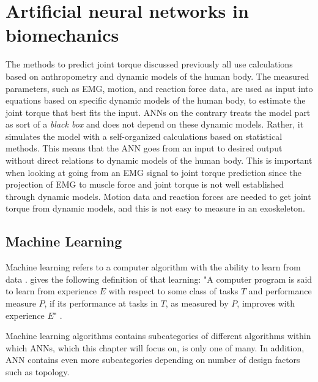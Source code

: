 \section{Artificial neural networks in biomechanics}
The methods to predict joint torque discussed previously all use calculations based on anthropometry and dynamic models of the human body. 
The measured parameters, such as \ac{EMG}, motion, and reaction force data, are used as input into equations based on specific dynamic models of the human body, to estimate the joint torque that best fits the input.
\acp{ANN} on the contrary treats the model part as sort of a \textit{black box} and does not depend on these dynamic models. 
Rather, it simulates the model with a self-organized calculations based on statistical methods.
This means that the \ac{ANN} goes from an input to desired output without direct relations to dynamic models of the human body.
This is important when looking at going from an \ac{EMG} signal to joint torque prediction since the projection of \ac{EMG} to muscle force and joint torque is not well established through dynamic models.
Motion data and reaction forces are needed to get joint torque from dynamic models, and this is not easy to measure in an exoskeleton.


\subsection{Machine Learning}
Machine learning refers to a computer algorithm with the ability to learn from data \cite{Goodfellow2016}. \citeauthor{Mitchell1997} gives the following definition of that learning: "A computer program is said to learn from experience $E$ with respect to some class of tasks $T$ and performance measure $P$, if its performance at tasks in $T$, as measured by $P$, improves with experience $E$" \parencite[2]{Mitchell1997}.

Machine learning algorithms contains subcategories of different algorithms within which \acp{ANN}, which this chapter will focus on, is only one of many.
In addition, \ac{ANN} contains even more subcategories depending on number of design factors such as topology.

